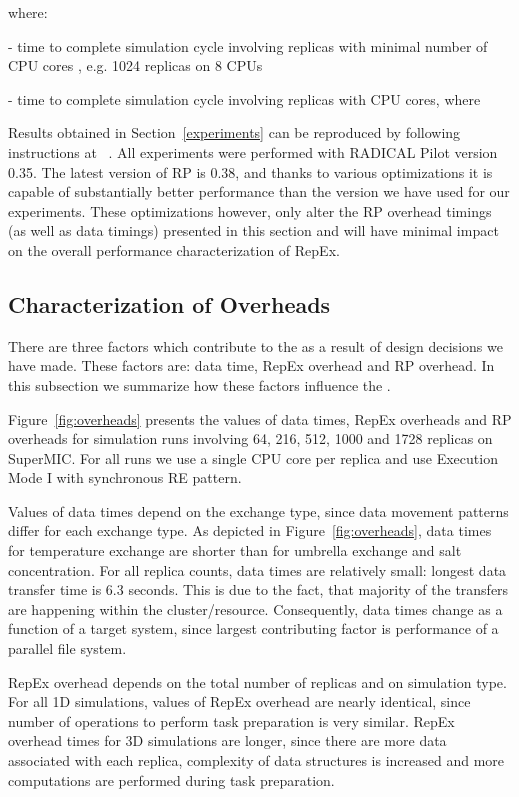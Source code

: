 \documentclass{sig-alternate-05-2015}
\begin{document}
where:
\begin{compactitem}
  \item  - time to complete simulation cycle involving  replicas with minimal number of CPU cores , e.g. 1024 replicas on 8 CPUs
  \item  - time to complete simulation cycle involving  replicas with  CPU cores, where 
\end{compactitem}

Results obtained in Section~\ref{experiments} can be reproduced by following instructions at ~\cite{repex-experiments}. All experiments were performed with RADICAL Pilot version 0.35. The latest version of RP is 0.38, and thanks to various optimizations it is capable of substantially better performance than the version we have used for our experiments. These optimizations however, only alter the RP overhead timings (as well as data timings) presented in this section and will have minimal impact on the overall performance characterization of RepEx.

\subsection{Characterization of Overheads} \label{over}

There are three factors which contribute to the  as a result of design decisions we have made. These factors are: data time, RepEx overhead and RP overhead. In this subsection we summarize how these factors influence the .

Figure~\ref{fig:overheads} presents the values of data times, RepEx overheads and RP overheads for simulation runs involving 64, 216, 512, 1000 and 1728 replicas on SuperMIC. For all runs we use a single CPU core per replica and use Execution Mode I with synchronous RE pattern.

Values of data times depend on the exchange type, since data movement patterns differ for each exchange type. As depicted in Figure~\ref{fig:overheads}, data times for temperature exchange are shorter than for umbrella exchange and salt concentration. For all replica counts, data times are relatively small: longest data transfer time is 6.3 seconds. This is due to the fact, that majority of the transfers are happening within the cluster/resource. Consequently, data times change as a function of a target system, since largest contributing factor is performance of a parallel file system.

RepEx overhead depends on the total number of replicas and on simulation type. For all 1D simulations, values of RepEx overhead are nearly identical, since number of operations to perform task preparation is very similar.  RepEx overhead times for 3D simulations are longer, since there are more data associated with each replica, complexity of data structures is increased and more computations are performed during task preparation. 
\end{document}
